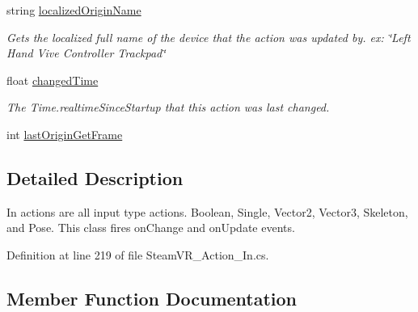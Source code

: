 \begin{DoxyCompactItemize}
string \mbox{\hyperlink{class_valve_1_1_v_r_1_1_steam_v_r___action___in___source_a7c08a0c1332f4168e4b0e628772ac4fe}{localized\+Origin\+Name}}
\begin{DoxyCompactList}\small\item\em Gets the localized full name of the device that the action was updated by. ex\+: \char`\"{}\+Left Hand Vive Controller Trackpad\char`\"{} \end{DoxyCompactList}\item 
float \mbox{\hyperlink{class_valve_1_1_v_r_1_1_steam_v_r___action___in___source_abc08aab34cfed3310ff9dd315c93faaa}{changed\+Time}}
\begin{DoxyCompactList}\small\item\em The Time.\+realtime\+Since\+Startup that this action was last changed. \end{DoxyCompactList}\item 
int \mbox{\hyperlink{class_valve_1_1_v_r_1_1_steam_v_r___action___in___source_abf8faf86eba30e693269881582e81875}{last\+Origin\+Get\+Frame}}
\end{DoxyCompactItemize}


\subsection{Detailed Description}
In actions are all input type actions. Boolean, Single, Vector2, Vector3, Skeleton, and Pose. This class fires on\+Change and on\+Update events. 



Definition at line 219 of file Steam\+V\+R\+\_\+\+Action\+\_\+\+In.\+cs.



\subsection{Member Function Documentation}
\mbox{\label{class_valve_1_1_v_r_1_1_steam_v_r___action___in___source_a8bd382c6351dc8d36b6ee63703e2c368}} 
